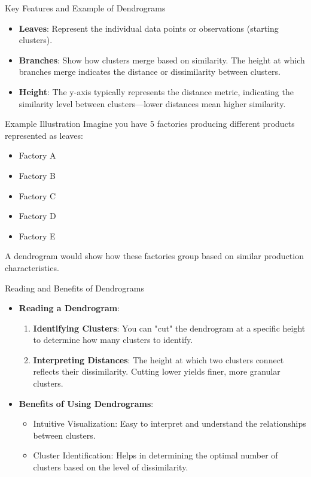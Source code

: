\documentclass[aspectratio=169]{beamer}
\begin{document}
\begin{frame}[fragile]{Key Features and Example of Dendrograms}
    \begin{itemize}
        \item \textbf{Leaves}: Represent the individual data points or observations (starting clusters).
        \item \textbf{Branches}: Show how clusters merge based on similarity. The height at which branches merge indicates the distance or dissimilarity between clusters.
        \item \textbf{Height}: The y-axis typically represents the distance metric, indicating the similarity level between clusters—lower distances mean higher similarity.
    \end{itemize}
    
    \begin{block}{Example Illustration}
        Imagine you have 5 factories producing different products represented as leaves:
        \begin{itemize}
            \item Factory A
            \item Factory B
            \item Factory C
            \item Factory D
            \item Factory E
        \end{itemize}
        A dendrogram would show how these factories group based on similar production characteristics.
    \end{block}
\end{frame}

\begin{frame}[fragile]{Reading and Benefits of Dendrograms}
    \begin{itemize}
        \item \textbf{Reading a Dendrogram}:
        \begin{enumerate}
            \item \textbf{Identifying Clusters}: You can "cut" the dendrogram at a specific height to determine how many clusters to identify.
            \item \textbf{Interpreting Distances}: The height at which two clusters connect reflects their dissimilarity. Cutting lower yields finer, more granular clusters.
        \end{enumerate}
        
        \item \textbf{Benefits of Using Dendrograms}:
        \begin{itemize}
            \item Intuitive Visualization: Easy to interpret and understand the relationships between clusters.
            \item Cluster Identification: Helps in determining the optimal number of clusters based on the level of dissimilarity.
        \end{itemize}
    \end{itemize}
\end{frame}
\end{document}

